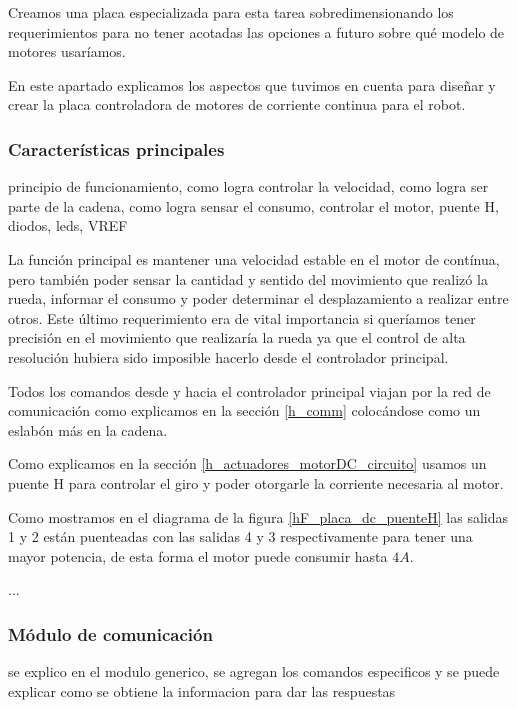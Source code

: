Creamos una placa especializada para esta tarea sobredimensionando los requerimientos para no tener acotadas las opciones
a futuro sobre qu\'e modelo de motores usar\'iamos.

En este apartado explicamos los aspectos que tuvimos en cuenta para dise\~nar y crear la placa controladora de motores
de corriente continua para el robot.

\subsubsection{Caracter\'isticas principales}
\label{h_placas_motorDC_caracteristicas}

principio de funcionamiento, como logra controlar la velocidad, como logra ser parte de la cadena, como logra sensar el consumo, controlar el motor, puente H, diodos, leds, VREF

La funci\'on principal es mantener una velocidad estable en el motor de cont\'inua, pero tambi\'en poder sensar la cantidad
y sentido del movimiento que realiz\'o la rueda, informar el consumo y poder determinar el desplazamiento a realizar entre otros.
Este \'ultimo requerimiento era de vital importancia si quer\'iamos tener precisi\'on en el movimiento que realizar\'ia la rueda
ya que el control de alta resoluci\'on hubiera sido imposible hacerlo desde el controlador principal.

Todos los comandos desde y hacia el controlador principal viajan por la red de comunicaci\'on como explicamos en la secci\'on
\ref{h_comm} coloc\'andose como un eslab\'on m\'as en la cadena.



Como explicamos en la secci\'on \ref{h_actuadores_motorDC_circuito} usamos un puente H para controlar el giro y poder otorgarle
la corriente necesaria al motor.



Como mostramos en el diagrama de la figura \ref{hF_placa_dc_puenteH} las salidas 1 y 2 est\'an puenteadas con las salidas 4 y 3
respectivamente para tener una mayor potencia, de esta forma el motor puede consumir hasta $4A$.


...


\subsubsection{M\'odulo de comunicaci\'on}
\label{h_placas_motorDC_comm}

se explico en el modulo generico, se agregan los comandos especificos y se puede explicar como se obtiene la informacion para dar las respuestas

